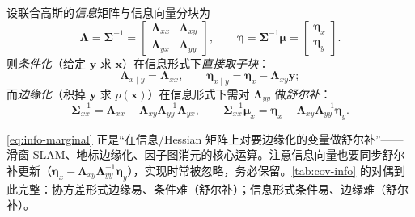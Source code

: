 \begin{proposition}[信息形式的条件化与边缘化（对偶）]\label{prop:info-marg-cond}
设联合高斯的\emph{信息}矩阵与信息向量分块为
\begin{equation*}
  \boldsymbol{\Lambda}=\boldsymbol{\Sigma}^{-1}=\begin{bmatrix}\boldsymbol{\Lambda}_{xx}&\boldsymbol{\Lambda}_{xy}\\\boldsymbol{\Lambda}_{yx}&\boldsymbol{\Lambda}_{yy}\end{bmatrix},\qquad
  \boldsymbol{\eta}=\boldsymbol{\Sigma}^{-1}\boldsymbol{\mu}=\begin{bmatrix}\boldsymbol{\eta}_x\\\boldsymbol{\eta}_y\end{bmatrix}.
\end{equation*}
则\emph{条件化}（给定 $\mathbf{y}$ 求 $\mathbf{x}$）在信息形式下\emph{直接取子块}：
\begin{equation}
  \boldsymbol{\Lambda}_{x\mid y}=\boldsymbol{\Lambda}_{xx},\qquad \boldsymbol{\eta}_{x\mid y}=\boldsymbol{\eta}_x-\boldsymbol{\Lambda}_{xy}\mathbf{y};
  \label{eq:info-cond}
\end{equation}
而\emph{边缘化}（积掉 $\mathbf{y}$ 求 $p(\mathbf{x})$）在信息形式下需对 $\boldsymbol{\Lambda}_{yy}$ 做\emph{舒尔补}\cite{barfoot2024state}：
\begin{equation}
  \boxed{\ \boldsymbol{\Sigma}_{xx}^{-1}=\boldsymbol{\Lambda}_{xx}-\boldsymbol{\Lambda}_{xy}\boldsymbol{\Lambda}_{yy}^{-1}\boldsymbol{\Lambda}_{yx},\qquad
  \boldsymbol{\Sigma}_{xx}^{-1}\boldsymbol{\mu}_x=\boldsymbol{\eta}_x-\boldsymbol{\Lambda}_{xy}\boldsymbol{\Lambda}_{yy}^{-1}\boldsymbol{\eta}_y.\ }
  \label{eq:info-marginal}
\end{equation}
\end{proposition}
\noindent\cref{eq:info-marginal} 正是“在信息/Hessian 矩阵上对要边缘化的变量做舒尔补”——滑窗 SLAM、地标边缘化、因子图消元的核心运算。注意信息向量也要同步舒尔补更新（$\boldsymbol{\eta}_x-\boldsymbol{\Lambda}_{xy}\boldsymbol{\Lambda}_{yy}^{-1}\boldsymbol{\eta}_y$），实现时常被忽略，务必保留。\cref{tab:cov-info} 的对偶到此完整：协方差形式边缘易、条件难（舒尔补）；信息形式条件易、边缘难（舒尔补）。

